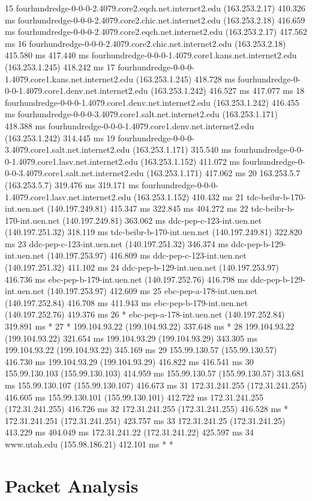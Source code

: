 \documentclass{article}
\begin{document}
\begin{enumerate}[a.]
\begin{code}
15  fourhundredge-0-0-0-2.4079.core2.eqch.net.internet2.edu (163.253.2.17)  410.326 ms
    fourhundredge-0-0-0-2.4079.core2.chic.net.internet2.edu (163.253.2.18)  416.659 ms
    fourhundredge-0-0-0-2.4079.core2.eqch.net.internet2.edu (163.253.2.17)  417.562 ms
16  fourhundredge-0-0-0-2.4079.core2.chic.net.internet2.edu (163.253.2.18)  415.580 ms  417.440 ms
    fourhundredge-0-0-0-1.4079.core1.kans.net.internet2.edu (163.253.1.245)  418.242 ms
17  fourhundredge-0-0-0-1.4079.core1.kans.net.internet2.edu (163.253.1.245)  418.728 ms
    fourhundredge-0-0-0-1.4079.core1.denv.net.internet2.edu (163.253.1.242)  416.527 ms  417.077 ms
18  fourhundredge-0-0-0-1.4079.core1.denv.net.internet2.edu (163.253.1.242)  416.455 ms
    fourhundredge-0-0-0-3.4079.core1.salt.net.internet2.edu (163.253.1.171)  418.388 ms
    fourhundredge-0-0-0-1.4079.core1.denv.net.internet2.edu (163.253.1.242)  314.445 ms
19  fourhundredge-0-0-0-3.4079.core1.salt.net.internet2.edu (163.253.1.171)  315.540 ms
    fourhundredge-0-0-0-1.4079.core1.lasv.net.internet2.edu (163.253.1.152)  411.072 ms
    fourhundredge-0-0-0-3.4079.core1.salt.net.internet2.edu (163.253.1.171)  417.062 ms
20  163.253.5.7 (163.253.5.7)  319.476 ms  319.171 ms
    fourhundredge-0-0-0-1.4079.core1.lasv.net.internet2.edu (163.253.1.152)  410.432 ms
21  tdc-beibr-b-170-int.uen.net (140.197.249.81)  415.347 ms  322.845 ms  404.272 ms
22  tdc-beibr-b-170-int.uen.net (140.197.249.81)  363.062 ms
    ddc-pep-c-123-int.uen.net (140.197.251.32)  318.119 ms
    tdc-beibr-b-170-int.uen.net (140.197.249.81)  322.820 ms
23  ddc-pep-c-123-int.uen.net (140.197.251.32)  346.374 ms
    ddc-pep-b-129-int.uen.net (140.197.253.97)  416.809 ms
    ddc-pep-c-123-int.uen.net (140.197.251.32)  411.102 ms
24  ddc-pep-b-129-int.uen.net (140.197.253.97)  416.736 ms
    ebc-pep-b-179-int.uen.net (140.197.252.76)  416.798 ms
    ddc-pep-b-129-int.uen.net (140.197.253.97)  412.609 ms
25  ebc-pep-a-178-int.uen.net (140.197.252.84)  416.708 ms  411.943 ms
    ebc-pep-b-179-int.uen.net (140.197.252.76)  419.376 ms
26  * ebc-pep-a-178-int.uen.net (140.197.252.84)  319.891 ms *
27  * 199.104.93.22 (199.104.93.22)  337.648 ms *
28  199.104.93.22 (199.104.93.22)  321.654 ms
    199.104.93.29 (199.104.93.29)  343.305 ms
    199.104.93.22 (199.104.93.22)  345.169 ms
29  155.99.130.57 (155.99.130.57)  416.730 ms
    199.104.93.29 (199.104.93.29)  416.822 ms  416.541 ms
30  155.99.130.103 (155.99.130.103)  414.959 ms
    155.99.130.57 (155.99.130.57)  313.681 ms
    155.99.130.107 (155.99.130.107)  416.673 ms
31  172.31.241.255 (172.31.241.255)  416.605 ms
    155.99.130.101 (155.99.130.101)  412.722 ms
    172.31.241.255 (172.31.241.255)  416.726 ms
32  172.31.241.255 (172.31.241.255)  416.528 ms *
    172.31.241.251 (172.31.241.251)  423.757 ms
33  172.31.241.25 (172.31.241.25)  413.229 ms  404.049 ms
    172.31.241.22 (172.31.241.22)  425.597 ms
34  www.utah.edu (155.98.186.21)  412.101 ms * *
\end{code}

\end{enumerate}

\section{Packet Analysis}

\clearpage

\end{document}
